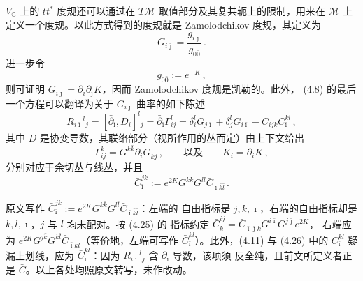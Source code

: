 $V_{\mathbb{C}}$ 上的 $tt^*$ 度规还可以通过在 $T\mathcal{M}$ 取值部分及其复共轭上的限制，用来在
$\mathcal{M}$ 上定义一个度规。以此方式得到的度规就是 Zamolodchikov 度规，其定义为
\begin{equation}
  G_{i\bar\jmath}=\frac{g_{i\bar\jmath}}{g_{0\bar 0}}\,.
  \tag{4.10}
  \label{eq:4.10}
\end{equation}
进一步令
\[
  g_{0\bar 0}:=e^{-K}\,,
\]
则可证明 $G_{i\bar\jmath}=\partial_i\partial_{\bar\jmath}K$，因而 Zamolodchikov 度规是凯勒的。此外，
(4.8) 的最后一个方程可以翻译为关于 $G_{i\bar\jmath}$ 曲率的如下陈述
\begin{equation}
  R_{i\bar\imath}{}^{l}{}_{j}=[\bar\partial_{\bar\imath},D_i]^l{}_j
  =\bar\partial_{\bar\imath}\Gamma^l_{ij}
  =\delta^l_iG_{j\bar\imath}+\delta^l_jG_{i\bar\imath}-C_{ijk}C^{kl}_{\bar\imath}\,,
  \tag{4.11}
  \label{eq:4.11}
\end{equation}
其中 $D$ 是协变导数，其联络部分（视所作用的丛而定）由上下文给出
\[
  \Gamma^k_{ij}=G^{k\bar k}\partial_i G_{\bar kj}\,,\qquad\text{以及}\qquad K_i=\partial_iK\,,
\]
分别对应于余切丛与线丛，并且
\[
  \bar C^{jk}_{\bar\imath}:=e^{2K}G^{k\bar k}G^{l\bar l}\bar C_{\bar\imath\bar k\bar l}\,.
\]

\begin{yizhu}[原文疑误]
原文写作 $\bar C^{jk}_{\bar\imath}:=e^{2K}G^{k\bar k}G^{l\bar l}\bar C_{\bar\imath\bar k\bar l}$：左端的
自由指标是 $j,k,\bar\imath$，右端的自由指标却是 $k,l,\bar\imath$，$j$ 与 $l$ 均未配对。按 (4.25) 的
指标约定 $\bar C^{ij}_{\bar k}=\bar C_{\bar\imath\bar\jmath\bar k}G^{i\bar\imath}G^{j\bar\jmath}e^{2K}$，
右端应为 $e^{2K}G^{j\bar k}G^{k\bar l}\bar C_{\bar\imath\bar k\bar l}$（等价地，左端可写作
$\bar C^{kl}_{\bar\imath}$）。此外，(4.11) 与 (4.26) 中的 $C^{kl}_{\bar\imath}$ 疑漏上划线，应为
$\bar C^{kl}_{\bar\imath}$：因为 $R_{i\bar\imath}{}^l{}_j$ 含 $\bar\partial_{\bar\imath}$ 导数，该项须
反全纯，且前文所定义者正是 $\bar C$。以上各处均照原文转写，未作改动。
\end{yizhu}

